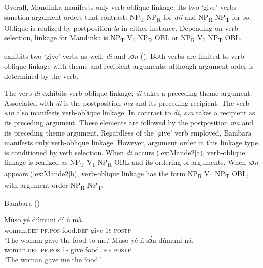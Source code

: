 \documentclass[output=paper,colorlinks,citecolor=brown]{langscibook}
\begin{document}
Overall, Mandinka manifests only verb-oblique linkage. Its two ‘give’ verbs sanction argument orders that contrast: NP\textsubscript{T} NP\textsubscript{R} for \textit{dii} and NP\textsubscript{R} NP\textsubscript{T} for \textit{so}. Oblique is realized by postposition \textit{la} in either instance. Depending on verb selection, linkage for Mandinka is NP\textsubscript{T} V\textsubscript{1} NP\textsubscript{R} OBL or NP\textsubscript{R} V\textsubscript{1} NP\textsubscript{T} OBL.

 exhibits two ‘give’ verbs as well, \textit{di} and \textit{sɔn} (\cite{Creissels2007}). Both verbs are limited to verb-oblique linkage with theme and recipient arguments, although argument order is determined by the verb.

The verb \textit{di} exhibits verb-oblique linkage; \textit{di} takes a preceding theme argument. Associated with \textit{di} is the postposition \textit{ma} and its preceding recipient. The verb \textit{sɔn} also manifests verb-oblique linkage. In contrast to \textit{di}, \textit{sɔn} takes a recipient as its preceding argument. These elements are followed by the postposition \textit{ma} and its preceding theme argument. Regardless of the ‘give’ verb employed, Bambara manifests only verb-oblique linkage. However, argument order in this linkage type is conditioned by verb selection. When \textit{di} occurs (\ref{ex:Mande2}a), verb-oblique linkage is realized as NP\textsubscript{T} V\textsubscript{1} NP\textsubscript{R} OBL and its ordering of arguments. When \textit{sɔn} appears (\ref{ex:Mande2}b), verb-oblique linkage has the form NP\textsubscript{R} V\textsubscript{1} NP\textsubscript{T} OBL, with argument order NP\textsubscript{R} NP\textsubscript{T}.

\ea \label{ex:Mande2} Bambara (\cite [8-9] {Creissels2007})
\begin{xlist}
\ex
\gll Mùso						yé				dúmuni		dí			ń		mà.\\
						woman.\textsc{def}		\textsc{pf.pos}	food.\textsc{def}	give		1\textsc{s}	\textsc{postp}\\
\glt						‘The woman gave the food to me.’
\ex
\gll 	Mùso						yé				ń		sɔ́n		dúmuni		ná. \\
						woman.\textsc{def}		\textsc{pf.pos}	1\textsc{s}	give		food.\textsc{def}	\textsc{postp} \\
\glt					 	‘The woman gave me the food.’
\end{xlist}
\z
\end{document}
